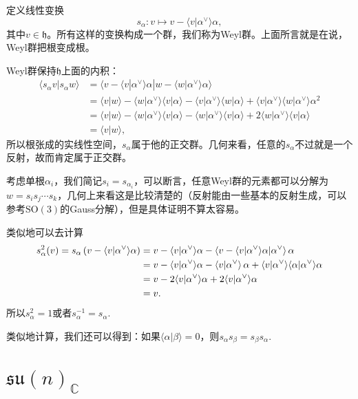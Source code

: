 \documentclass[9pt]{extarticle}
\newcommand{\cc}{\mathbb{C}}
\begin{document}
\para 定义线性变换
\[
	s_\alpha:v\mapsto v-\langle v|\alpha^\vee\rangle\alpha,
\]
其中$v\in \mathfrak{h}$。所有这样的变换构成一个群，我们称为Weyl群。上面所言就是在说，Weyl群把根变成根。

\para Weyl群保持$\mathfrak{h}$上面的内积：
\begin{align*}
	\langle s_\alpha v|s_\alpha w\rangle &= \langle v-\langle v|\alpha^\vee\rangle\alpha|w-\langle w|\alpha^\vee\rangle\alpha\rangle\\ &=\langle v|w\rangle - \langle w|\alpha^\vee\rangle \langle v| \alpha\rangle - \langle v|\alpha^\vee\rangle \langle w| \alpha\rangle +\langle v|\alpha^\vee\rangle\langle w|\alpha^\vee\rangle \alpha^2\\
	&= \langle v|w\rangle - \langle w|\alpha^\vee\rangle \langle v| \alpha\rangle - \langle w|\alpha^\vee\rangle \langle v| \alpha\rangle +2\langle w|\alpha^\vee\rangle\langle v|\alpha\rangle\\
	&= \langle v|w\rangle,
\end{align*}
所以根张成的实线性空间，$s_\alpha$属于他的正交群。几何来看，任意的$s_\alpha$不过就是一个反射，故而肯定属于正交群。

考虑单根$\alpha_i$，我们简记$s_i=s_{\alpha_i}$，可以断言，任意Weyl群的元素都可以分解为$w=s_is_j\cdots s_k$，几何上来看这是比较清楚的（反射能由一些基本的反射生成，可以参考$\mathrm{SO}(3)$的Gauss分解），但是具体证明不算太容易。

\para 类似地可以去计算
\begin{align*}
	s_\alpha^2(v)=s_\alpha\left(v-\langle v|\alpha^\vee\rangle\alpha\right)&=v-\langle v|\alpha^\vee\rangle\alpha-\left\langle v-\langle v|\alpha^\vee\rangle\alpha\large|\alpha^\vee\right\rangle\alpha\\
	&=v-\langle v|\alpha^\vee\rangle\alpha-\left\langle v\large|\alpha^\vee\right\rangle\alpha+\langle v|\alpha^\vee\rangle\langle\alpha|\alpha^\vee\rangle\alpha\\
	&=v-2\langle v|\alpha^\vee\rangle\alpha+2\langle v|\alpha^\vee\rangle\alpha\\
	&=v.
\end{align*}
所以$s_\alpha^2=1$或者$s_\alpha^{-1}=s_\alpha$.

类似地计算，我们还可以得到：如果$\langle \alpha|\beta\rangle=0$，则$s_\alpha s_\beta=s_\beta s_\alpha$.

\section{$\mathfrak{su}(n)_\cc$}
\end{document}
